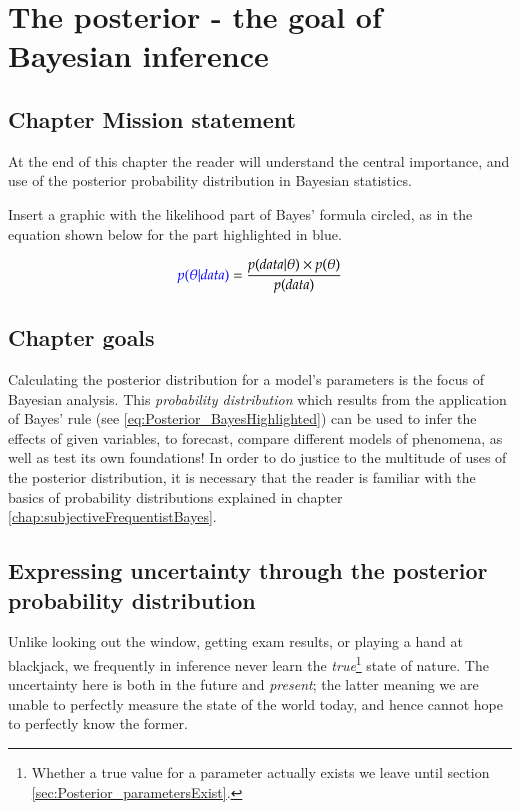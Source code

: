\documentclass[11pt,fullpage]{book}
\begin{document}
\chapter{The posterior - the goal of Bayesian inference}\label{chap:posterior}
\section{Chapter Mission statement}
At the end of this chapter the reader will understand the central importance, and use of the posterior probability distribution in Bayesian statistics.

Insert a graphic with the likelihood part of Bayes' formula circled, as in the equation shown below for the part highlighted in blue.

\begin{equation}
{\color{blue}p(\theta|data)} = \frac{p(data|\theta)\times p(\theta)}{p(data)}
\end{equation}\label{eq:Posterior_BayesHighlighted}

\section{Chapter goals}
Calculating the posterior distribution for a model's parameters is the focus of Bayesian analysis. This \textit{probability distribution} which results from the application of Bayes' rule (see \ref{eq:Posterior_BayesHighlighted}) can be used to infer the effects of given variables, to forecast, compare different models of phenomena, as well as test its own foundations! In order to do justice to the multitude of uses of the posterior distribution, it is necessary that the reader is familiar with the basics of probability distributions explained in chapter \ref{chap:subjectiveFrequentistBayes}. 

\section{Expressing uncertainty through the posterior probability distribution}\label{sec:Posterior_parameterUncertainty}
Unlike looking out the window, getting exam results, or playing a hand at blackjack, we frequently in inference never learn the \textit{true}\footnote{Whether a true value for a parameter actually exists we leave until section \ref{sec:Posterior_parametersExist}.} state of nature. The uncertainty here is both in the future and \textit{present}; the latter meaning we are unable to perfectly measure the state of the world today, and hence cannot hope to perfectly know the former.
\end{document}
